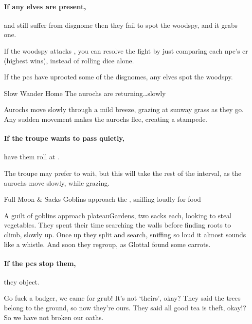 \paragraph{If any elves are present,}
and still suffer from \gls{disgnome} then
they fail to spot the \gls{woodspy}, and it grabs one.

If the \gls{woodspy} attacks , you can resolve the fight by just comparing each \gls{npc}'s \gls{cr} (highest wins), instead of rolling dice alone.

If the \glspl{pc} have uprooted some of the \glspl{disgnome}, any elves spot the \gls{woodspy}.

{Slow Wander Home}%
{The aurochs are returning\ldots slowly}%

Aurochs move slowly through a mild breeze, grazing at \gls{sunway} grass as they go.
Any sudden movement makes the aurochs flee, creating a stampede.

\paragraph{If the troupe wants to pass quietly,}
have them roll  at \tn[8].

The troupe may prefer to wait, but this will take the rest of the \gls{interval}, as the aurochs move slowly, while grazing.

{Full Moon \& Sacks}%
{Goblins approach the , sniffing loudly for food}%

A guilt of goblins approach \gls{plateauGardens}, two sacks each, looking to steal vegetables.
They spent their time searching the walls before finding roots to climb, slowly up.
Once up they split and search, sniffing so loud it almost sounds like a whistle.
And soon they regroup, as Glottal found some carrots.

\paragraph{If the \glspl{pc} stop them,}
they object.

\begin{speechtext}
  Go fuck a badger, we came for grub!
  It's not `theirs', okay?
  They said the trees belong to the ground, so now they're ours.
  They said all good tea is theft, okay!?
  So we have not broken our oaths.
\end{speechtext}

